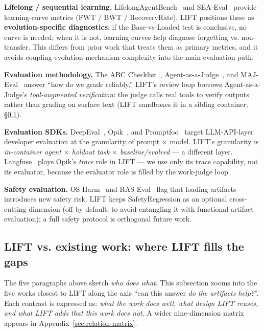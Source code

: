 \documentclass{article}
\begin{document}
\textbf{Lifelong / sequential learning.} LifelongAgentBench~\citep{zheng2025lifelongagentbench} and SEA-Eval~\citep{jiang2026seaeval} provide learning-curve metrics (FWT / BWT / RecoveryRate). LIFT positions these as \textbf{evolution-specific diagnostics}: if the Base-vs-Loaded test is conclusive, no curve is needed; when it is not, learning curves help diagnose forgetting vs. non-transfer. This differs from prior work that treats them as primary metrics, and it avoids coupling evolution-mechanism complexity into the main evaluation path.

\textbf{Evaluation methodology.} The ABC Checklist~\citep{zhu2025abc}, Agent-as-a-Judge~\citep{zhuge2024agentasajudge}, and MAJ-Eval~\citep{chen2026majeval} answer ``how do we grade reliably.'' LIFT's review loop borrows Agent-as-a-Judge's \emph{tool-augmented verification}: the judge calls real tools to verify outputs rather than grading on surface text (LIFT sandboxes it in a sibling container; \S\ref{sec:lift-vs-existing}).

\textbf{Evaluation SDKs.} DeepEval~\citep{confidentai_deepeval}, Opik~\citep{cometml_opik}, and Promptfoo~\citep{promptfoo} target LLM-API-layer developer evaluation at the granularity of prompt $\times$ model. LIFT's granularity is \emph{in-container agent $\times$ holdout task $\times$ baseline/evolved} --- a different layer. Langfuse~\citep{langfuse} plays Opik's \emph{trace} role in LIFT --- we use only its trace capability, not its evaluator, because the evaluator role is filled by the work-judge loop.

\textbf{Safety evaluation.} OS-Harm~\citep{kuntz2025osharm} and RAS-Eval~\citep{fu2025raseval} flag that loading artifacts introduces new safety risk. LIFT keeps SafetyRegression as an optional cross-cutting dimension (off by default, to avoid entangling it with functional artifact evaluation); a full safety protocol is orthogonal future work.

\subsection{LIFT vs. existing work: where LIFT fills the gaps}
\label{sec:lift-vs-existing}

The five paragraphs above sketch \emph{who does what}. This subsection zooms into the five works closest to LIFT along the axis ``can this answer \emph{do the artifacts help?}''. Each contrast is expressed as: \emph{what the work does well, what design LIFT reuses, and what LIFT adds that this work does not}. A wider nine-dimension matrix appears in Appendix~\ref{sec:relation-matrix}.
\end{document}

